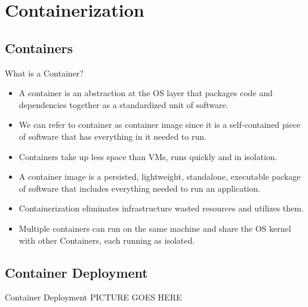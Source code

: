 

\section{Containerization}\label{sec:containerization}

\subsection{Containers}\label{subsec:containers}
\begin{frame}{What is a Container?}
    \begin{itemize}[<+- | alert@+>]
        \item A container is an abstraction at the OS layer that packages code and dependencies together as a standardized unit of software.
        \item We can refer to container as container image since it is a self-contained piece of software that has everything in it needed to run.
        \item Containers take up less space than VMs, runs quickly and in isolation.
        \item A container image is a persisted, lightweight, standalone, executable package of software that includes everything needed to run an application.
        \item Containerization eliminates infrastructure wasted resources and utilizes them.
        \item Multiple containers can run on the same machine and share the OS kernel with other Containers, each running as isolated.
    \end{itemize}
\end{frame}

\subsection{Container Deployment}\label{subsec:container-deployment}
\begin{frame}{Container Deployment}
    PICTURE GOES HERE
\end{frame}

